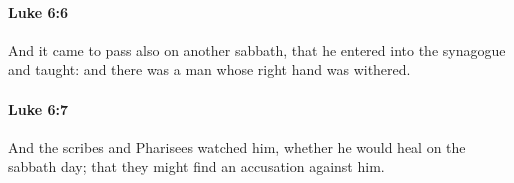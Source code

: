 		\paragraph{Luke 6:6} %
			\label{LUKE-6-6}

			And it came to pass also on another sabbath, that he entered into the synagogue and taught: and there was a man whose right hand was withered.

			\begin{framed}
			\scriptsize
				\begin{compactdesc}
					\item[SBLG] 
				\end{compactdesc}
			\end{framed}

		\paragraph{Luke 6:7} %
			\label{LUKE-6-7}

			And the scribes and Pharisees watched him, whether he would heal on the sabbath day; that they might find an accusation against him.

